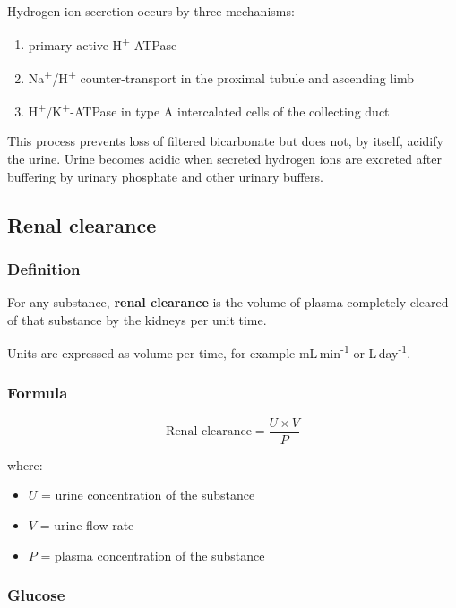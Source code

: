 \documentclass[11pt,a4paper]{article}
\begin{document}
Hydrogen ion secretion occurs by three mechanisms:
\begin{enumerate}
    \item primary active H\textsuperscript{+}-ATPase
    \item Na\textsuperscript{+}/H\textsuperscript{+} counter-transport in the proximal tubule and ascending limb
    \item H\textsuperscript{+}/K\textsuperscript{+}-ATPase in type A intercalated cells of the collecting duct
\end{enumerate}

This process prevents loss of filtered bicarbonate but does not, by itself, acidify the urine. Urine becomes acidic when secreted hydrogen ions are excreted after buffering by urinary phosphate and other urinary buffers.

\subsection{Renal clearance}

\subsubsection{Definition}

For any substance, \textbf{renal clearance} is the volume of plasma completely cleared of that substance by the kidneys per unit time.

Units are expressed as volume per time, for example mL\,min\textsuperscript{-1} or L\,day\textsuperscript{-1}.

\subsubsection{Formula}

\[
\text{Renal clearance} = \frac{U \times V}{P}
\]

where:
\begin{itemize}
    \item $U$ = urine concentration of the substance
    \item $V$ = urine flow rate
    \item $P$ = plasma concentration of the substance
\end{itemize}

\subsubsection{Glucose}
\end{document}
